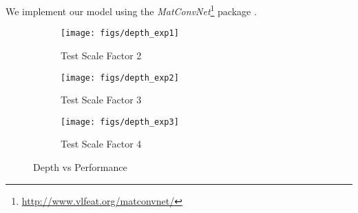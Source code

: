 \documentclass[10pt,twocolumn,letterpaper]{article}
\begin{document}
We implement our model using the \textit{MatConvNet}\footnote{\url{ http://www.vlfeat.org/matconvnet/}} package \cite{arXiv:1412.4564}.


\begin{figure*}[t]
\vspace{-.5cm}
	\centering
	\begin{subfigure}{0.25\textwidth}
		\texttt{[image: figs/depth\_exp1]}
		\caption{Test Scale Factor 2}
		\label{fig:gull}
	\end{subfigure}\quad
\begin{subfigure}{0.25\textwidth}
		\texttt{[image: figs/depth\_exp2]}
		\caption{Test Scale Factor 3}
		\label{fig:tiger}
	\end{subfigure}
	\quad
	\begin{subfigure}{0.25\textwidth}
		\texttt{[image: figs/depth\_exp3]}
		\caption{Test Scale Factor 4}
		\label{fig:mouse}
	\end{subfigure}
	\caption{Depth vs Performance}\label{fig:depth}
\end{figure*}
\end{document}
